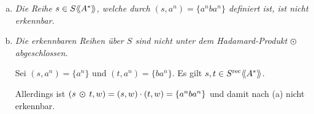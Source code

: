 \documentclass{scrartcl}
\newcommand{\llangle}{\langle\hspace{-0.2em}\langle}
\newcommand{\rrangle}{\rangle\hspace{-0.2em}\rangle}
\begin{document}
\begin{enumerate}[(a)]
    \item \textsl{Die Reihe $s \in S\llangle A^* \rrangle$, welche durch $(s, a^n) = \{a^nba^n\}$ definiert ist, ist nicht erkennbar.}

    \item \textsl{Die erkennbaren Reihen über $S$ sind nicht unter dem Hadamard-Produkt $\varodot$ abgeschlossen.}

      Sei $(s, a^n) = \{a^n\}$ und $(t, a^n) = \{ba^n\}$. Es gilt $s, t \in S^{\text{rec}}\llangle A^* \rrangle$.

      Allerdings ist $(s\,\varodot\,t, w) = (s, w) \cdot (t, w) = \{a^nba^n\}$ und damit nach (a) nicht erkennbar.
\end{enumerate}
\end{document}
